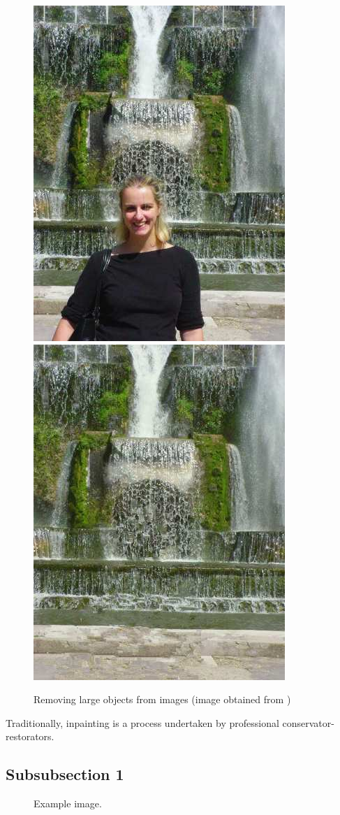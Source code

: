 \documentclass[12pt]{article} %
\theoremstyle{plain}
\theoremstyle{definition}
\theoremstyle{remark}
\begin{document}
\begin{figure}[H]
\centering
  \includegraphics[width=0.45\columnwidth]{../figures/researchmicros-000.jpg}
  \hfill
  \includegraphics[width=0.45\columnwidth]{../figures/researchmicros-001.jpg}
\caption{Removing large objects from images (image obtained from \cite{Criminisi2004})}
\end{figure}

Traditionally, inpainting is a process undertaken by professional conservator-restorators.

\subsection{Subsubsection 1} %

\lipsum[3] %

\begin{figure}[H] %
\caption{Example image.}
\label{fig:speciation}
\end{figure}
\end{document}
